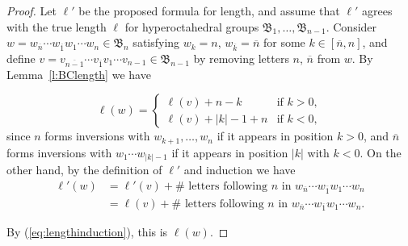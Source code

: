 \documentclass[12pt]{amsart}
\theoremstyle{definition}
\numberwithin{equation}{section}
\newcommand{\bn}{\mathfrak{B}_n}
\newcommand{\ol}[1]{\overline{#1}}
\begin{document}
    \begin{proof}
Let $\ell'$ be the proposed formula for length, and assume that $\ell'$ agrees with the true length $\ell$ for hyperoctahedral groups $\mathfrak B_1,\dotsc, \mathfrak B_{n-1}$. Consider $w  = w_{\ol n} \cdots w_{\ol1} w_1 \cdots w_n \in \bn$ satisfying $w_k = n$, $w_{\ol k} = \ol n$ for some 
$k \in [\ol n,n]$, and define $v = v_{\ol{n-1}} \cdots v_{\ol1} v_1 \cdots v_{n-1} \in \mathfrak B_{n-1}$ 
by removing letters $n$, $\ol n$ from $w$. By Lemma~\ref{l:BClength} we have 

\begin{equation}\label{eq:lengthinduction}
    \ell(w) = \begin{cases}
        \ell(v) + n-k &\text{if $k >0$},\\
       \ell(v) + |k|-1 + n &\text{if $k < 0$},
       \end{cases}
\end{equation}
since $n$ forms inversions with $w_{k+1}, \dotsc, w_n$ if it appears in position $k > 0$, and $\ol n$ forms inversions with $w_1 \cdots w_{|k|-1}$ if it appears in position $|k|$ with $k < 0$. On the other hand, by the definition of $\ell'$ and induction we have
\begin{equation*}
\begin{aligned}
       \ell'(w) &= 
       \ell'(v) + \# \text{ letters following $n$ in $w_{\ol n} \cdots w_{\ol1} w_1 \cdots w_n$} \\
       &= \ell(v) + \# \text{ letters following $n$ in $w_{\ol n} \cdots w_{\ol1} w_1 \cdots w_n$}.
    \end{aligned}
\end{equation*}

By (\ref{eq:lengthinduction}), this is $\ell(w)$.
 \end{proof}
\end{document}
